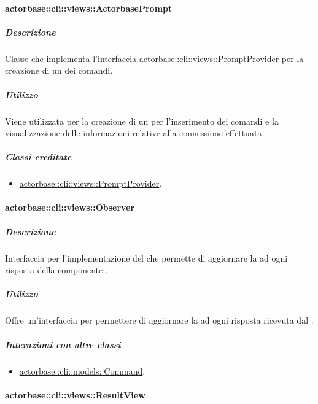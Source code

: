 \documentclass{scalatekids-article}
\begin{document}
\paragraph{actorbase::cli::views::ActorbasePrompt}
\label{sec:actorbase::cli::views::ActorbasePrompt}

\subparagraph{Descrizione}

Classe che implementa l'interfaccia \hyperref[sec:actorbase::cli::views::PromptProvider]{actorbase::cli::views::PromptProvider} per
la creazione di un  dei comandi.

\subparagraph{Utilizzo}

Viene utilizzata per la creazione di un  per l'inserimento dei
comandi e la visualizzazione delle informazioni relative alla connessione
effettuata. %

\subparagraph{Classi ereditate}

\begin{itemize}
\item \hyperref[sec:actorbase::cli::views::PromptProvider]{actorbase::cli::views::PromptProvider}.
\end{itemize}

\paragraph{actorbase::cli::views::Observer}
\label{sec:actorbase::cli::views::Observer}

\subparagraph{Descrizione}

Interfaccia per l'implementazione del  
che permette di aggiornare la  ad ogni risposta della componente
.

\subparagraph{Utilizzo}

Offre un'interfaccia per permettere di aggiornare la  ad ogni
risposta ricevuta dal .

\subparagraph{Interazioni con altre classi}

\begin{itemize}
\item \hyperref[sec:actorbase::cli::models::Command]{actorbase::cli::models::Command}.
\end{itemize}

\paragraph{actorbase::cli::views::ResultView}
\label{sec:actorbase::cli::views::ResultView}
\end{document}
